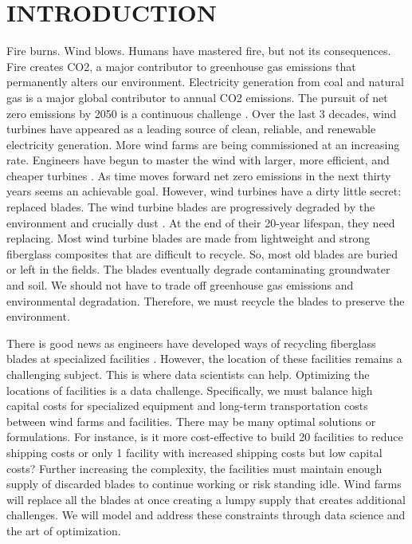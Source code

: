 \section*{INTRODUCTION}



\indent Fire burns. Wind blows. Humans have mastered fire, but not its consequences. Fire creates CO2, a major contributor to greenhouse gas emissions that permanently alters our environment. Electricity generation from coal and natural gas is a major global contributor to annual CO2 emissions. The pursuit of net zero emissions by 2050 is a continuous challenge \cite{RN19}. Over the last 3 decades, wind turbines have appeared as a leading source of clean, reliable, and renewable electricity generation. More wind farms are being commissioned at an increasing rate. Engineers have begun to master the wind with larger, more efficient, and cheaper turbines \cite{RN18}. As time moves forward net zero emissions in the next thirty years seems an achievable goal. However, wind turbines have a dirty little secret: replaced blades. The wind turbine blades are progressively degraded by the environment and crucially dust \cite{RN1}. At the end of their 20-year lifespan, they need replacing. Most wind turbine blades are made from lightweight and strong fiberglass composites that are difficult to recycle. So, most old blades are buried or left in the fields. The blades eventually degrade contaminating groundwater and soil. We should not have to trade off greenhouse gas emissions and environmental degradation. Therefore, we must recycle the blades to preserve the environment. 

There is good news as engineers have developed ways of recycling fiberglass blades at specialized facilities \cite{RN3}. However, the location of these facilities remains a challenging subject. This is where data scientists can help. Optimizing the locations of facilities is a data challenge. Specifically, we must balance high capital costs for specialized equipment and long-term transportation costs between wind farms and facilities. There may be many optimal solutions or formulations. For instance, is it more cost-effective to build 20 facilities to reduce shipping costs or only 1 facility with increased shipping costs but low capital costs? Further increasing the complexity, the facilities must maintain enough supply of discarded blades to continue working or risk standing idle. Wind farms will replace all the blades at once creating a lumpy supply that creates additional challenges. We will model and address these constraints through data science and the art of optimization. 


